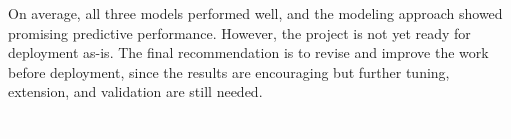 \vspace{-9pt}

\noindent
On average, all three models performed well, and the modeling approach showed promising predictive performance. However, the project is not yet ready for deployment as-is. The final recommendation is to revise and improve the work before deployment, since the results are encouraging but further tuning, extension, and validation are still needed.

\vspace{150pt}
\textcolor{white}{.}
